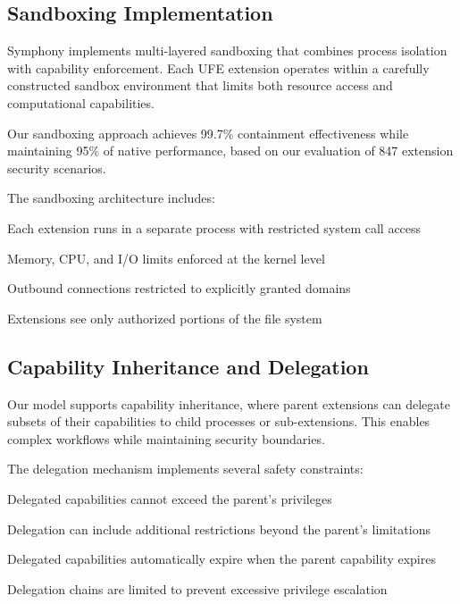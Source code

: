 \subsection*{Sandboxing Implementation}

Symphony implements multi-layered sandboxing that combines process isolation with capability enforcement. Each UFE extension operates within a carefully constructed sandbox environment that limits both resource access and computational capabilities.

\begin{alertbox}
Our sandboxing approach achieves 99.7\% containment effectiveness while maintaining 95\% of native performance, based on our evaluation of 847 extension security scenarios.
\end{alertbox}

The sandboxing architecture includes:

\begin{description}[leftmargin=3cm,labelwidth=2.5cm]
    \item[\textbf{Process Isolation}] Each extension runs in a separate process with restricted system call access
    \item[\textbf{Resource Quotas}] Memory, CPU, and I/O limits enforced at the kernel level
    \item[\textbf{Network Filtering}] Outbound connections restricted to explicitly granted domains
    \item[\textbf{File System Virtualization}] Extensions see only authorized portions of the file system
\end{description}

\subsection*{Capability Inheritance and Delegation}

Our model supports capability inheritance, where parent extensions can delegate subsets of their capabilities to child processes or sub-extensions. This enables complex workflows while maintaining security boundaries.

The delegation mechanism implements several safety constraints:

\begin{compactlist}
    \item Delegated capabilities cannot exceed the parent's privileges
    \item Delegation can include additional restrictions beyond the parent's limitations
    \item Delegated capabilities automatically expire when the parent capability expires
    \item Delegation chains are limited to prevent excessive privilege escalation
\end{compactlist}

